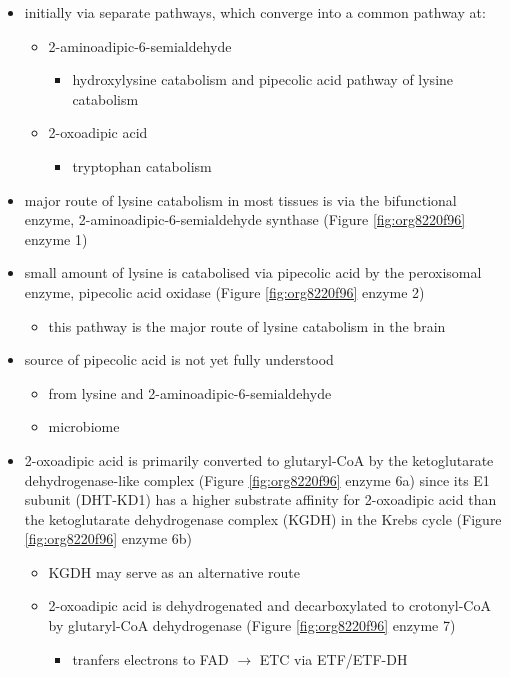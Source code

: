 \documentclass[12pt]{scrartcl}
\begin{document}
\begin{center}
\begin{center}
\begin{itemize}
\item initially via separate pathways, which converge into a common 
pathway at:
\begin{itemize}
\item 2-aminoadipic-6-semialdehyde
\begin{itemize}
\item hydroxylysine catabolism and pipecolic acid pathway of lysine
catabolism
\end{itemize}
\item 2-oxoadipic acid
\begin{itemize}
\item tryptophan catabolism
\end{itemize}
\end{itemize}
\item major route of lysine catabolism in most tissues is via the
bifunctional enzyme, 2-aminoadipic-6-semialdehyde synthase (Figure \ref{fig:org8220f96} enzyme 1)
\item small amount of lysine is catabolised via pipecolic acid by the
peroxisomal enzyme, pipecolic acid oxidase (Figure \ref{fig:org8220f96} enzyme 2)
\begin{itemize}
\item this pathway is the major route of lysine catabolism in the
brain
\end{itemize}
\item source of pipecolic acid is not yet fully understood
\begin{itemize}
\item from lysine and 2-aminoadipic-6-semialdehyde
\item microbiome
\end{itemize}
\item 2-oxoadipic acid is primarily converted to glutaryl-CoA by the
ketoglutarate dehydrogenase-like complex (Figure \ref{fig:org8220f96} enzyme 6a)
since its E1 subunit (DHT-KD1) has a higher substrate affinity for
2-oxoadipic acid than the ketoglutarate dehydrogenase complex (KGDH) in
the Krebs cycle (Figure \ref{fig:org8220f96} enzyme 6b)
\begin{itemize}
\item KGDH may serve as an alternative route
\item 2-oxoadipic acid is dehydrogenated and decarboxylated to
crotonyl-CoA by glutaryl-CoA dehydrogenase (Figure \ref{fig:org8220f96} enzyme 7)
\begin{itemize}
\item tranfers electrons to FAD \(\to\) ETC via ETF/ETF-DH

\end{itemize}
\end{itemize}
\end{itemize}
\end{center}
\end{center}
\end{document}

